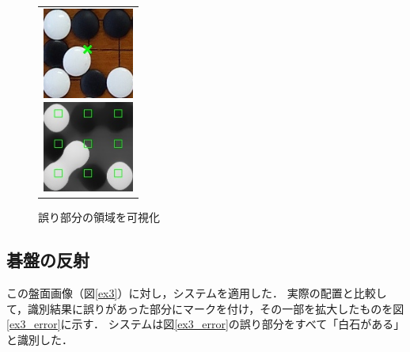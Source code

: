 \documentclass[summary]{nitocs}
\numberwithin{equation}{section}
\begin{document}
            \begin{figure}[tb] %
                \begin{center}
                  \begin{tabular}{c}
                    \begin{minipage}{0.5\hsize}
                      \begin{center}
                        \includegraphics[clip,width=30mm]{DSC_0099/TRIM_resultCompare.jpg}
                    \caption{事例2の誤り部分}
                    \label{ex2_error}
                      \end{center}
                    \end{minipage}
                    \begin{minipage}{0.5\hsize}
                      \begin{center}
                        \includegraphics[clip,width=30mm]{DSC_0099/TRIM_boardWithAreaImg.jpg}
                    \caption{誤り部分の領域を可視化}
                    \label{ex2_error_area}
                      \end{center}
                    \end{minipage}
                  \end{tabular}
                \end{center}
            \end{figure}


        \subsection{碁盤の反射} \label{reflection}%
            この盤面画像（図\ref{ex3}）に対し，システムを適用した．
            実際の配置と比較して，識別結果に誤りがあった部分にマークを付け，その一部を拡大したものを図\ref{ex3_error}に示す．
            システムは図\ref{ex3_error}の誤り部分をすべて「白石がある」と識別した．
\end{document}
